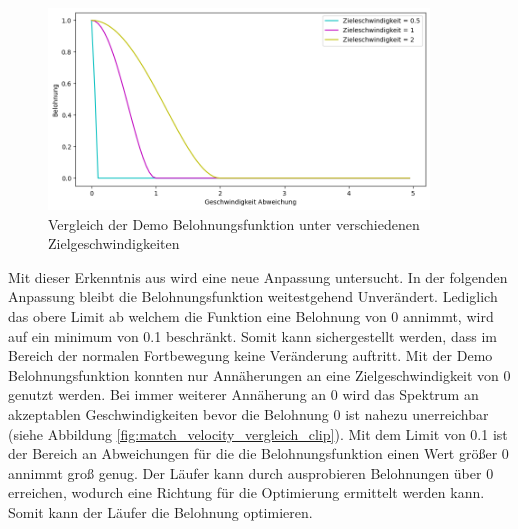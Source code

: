 \begin{figure}[H]
  \centering  
  \includegraphics[width=0.9\textwidth]{img/match_velocity_demo_vergleich}
  \caption{Vergleich der Demo Belohnungsfunktion unter verschiedenen Zielgeschwindigkeiten}
  \label{fig:match_velocity_demo_vergleich}
\end{figure}

Mit dieser Erkenntnis aus wird eine neue Anpassung untersucht. In der folgenden Anpassung bleibt die Belohnungsfunktion weitestgehend Unverändert. Lediglich das obere Limit ab welchem die Funktion eine Belohnung von 0 annimmt, wird auf ein minimum von 0.1 beschränkt. Somit kann sichergestellt werden, dass im Bereich der normalen Fortbewegung keine Veränderung auftritt. Mit der Demo Belohnungsfunktion konnten nur Annäherungen an eine Zielgeschwindigkeit von 0 genutzt werden. Bei immer weiterer Annäherung an 0 wird das Spektrum an akzeptablen Geschwindigkeiten bevor die Belohnung 0 ist nahezu unerreichbar (siehe Abbildung \ref{fig:match_velocity_vergleich_clip}). Mit dem Limit von 0.1 ist der Bereich an Abweichungen für die die Belohnungsfunktion einen Wert größer 0 annimmt groß genug. Der Läufer kann durch ausprobieren Belohnungen über 0 erreichen, wodurch eine Richtung für die Optimierung ermittelt werden kann. Somit kann der Läufer die Belohnung optimieren.\\

